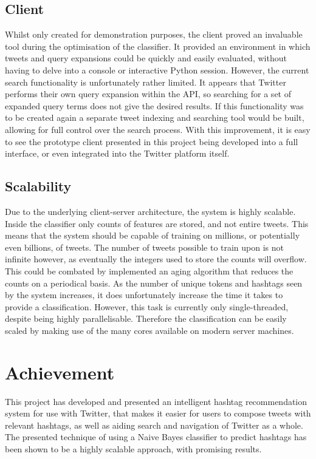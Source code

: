 \documentclass[11pt,a4paper]{report}
\begin{document}
\subsection{Client}
Whilst only created for demonstration purposes, the client proved an invaluable tool during the optimisation of the classifier. It provided an environment in which tweets and query expansions could be quickly and easily evaluated, without having to delve into a console or interactive Python session. However, the current search functionality is unfortunately rather limited. It appears that Twitter performs their own query expansion within the API, so searching for a set of expanded query terms does not give the desired results. If this functionality was to be created again a separate tweet indexing and searching tool would be built, allowing for full control over the search process. With this improvement, it is easy to see the prototype client presented in this project being developed into a full interface, or even integrated into the Twitter platform itself.

\subsection{Scalability}
Due to the underlying client-server architecture, the system is highly scalable. Inside the classifier only counts of features are stored, and not entire tweets. This means that the system should be capable of training on millions, or potentially even billions, of tweets. The number of tweets possible to train upon is not infinite however, as eventually the integers used to store the counts will overflow. This could be combated by implemented an aging algorithm that reduces the counts on a periodical basis. As the number of unique tokens and hashtags seen by the system increases, it does unfortunately increase the time it takes to provide a classification. However, this task is currently only single-threaded, despite being highly parallelisable. Therefore the classification can be easily scaled by making use of the many cores available on modern server machines.

\section{Achievement}
This project has developed and presented an intelligent hashtag recommendation system for use with Twitter, that makes it easier for users to compose tweets with relevant hashtags, as well as aiding search and navigation of Twitter as a whole. The presented technique of using a Naive Bayes classifier to predict hashtags has been shown to be a highly scalable approach, with promising results.
\end{document}
